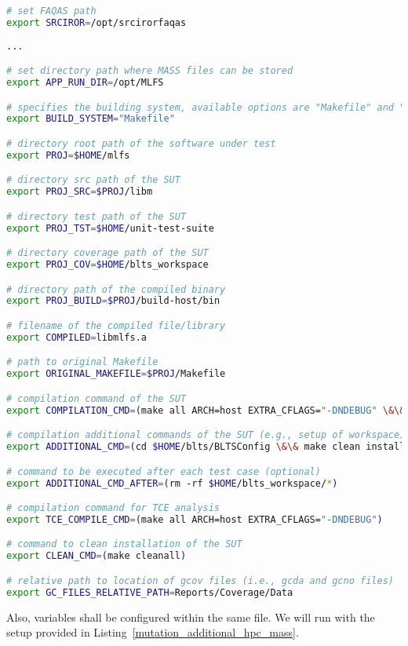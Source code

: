 \begin{lstlisting}[language=bash, label=mutation_additional_hpc ,caption=\MASS variables. Excerpt of mass\_conf.sh file.]
# set FAQAS path
export SRCIROR=/opt/srcirorfaqas
                                                     
...

# set directory path where MASS files can be stored
export APP_RUN_DIR=/opt/MLFS

# specifies the building system, available options are "Makefile" and "waf"
export BUILD_SYSTEM="Makefile"

# directory root path of the software under test
export PROJ=$HOME/mlfs

# directory src path of the SUT
export PROJ_SRC=$PROJ/libm

# directory test path of the SUT
export PROJ_TST=$HOME/unit-test-suite

# directory coverage path of the SUT
export PROJ_COV=$HOME/blts_workspace

# directory path of the compiled binary
export PROJ_BUILD=$PROJ/build-host/bin

# filename of the compiled file/library
export COMPILED=libmlfs.a

# path to original Makefile
export ORIGINAL_MAKEFILE=$PROJ/Makefile

# compilation command of the SUT
export COMPILATION_CMD=(make all ARCH=host EXTRA_CFLAGS="-DNDEBUG" \&\& make all COVERAGE="true" ARCH=host_cov EXTRA_CFLAGS="-DNDEBUG")

# compilation additional commands of the SUT (e.g., setup of workspace)
export ADDITIONAL_CMD=(cd $HOME/blts/BLTSConfig \&\& make clean install INSTALL_PATH="$HOME/blts_install" \&\& cd $HOME/blts_workspace \&\& $HOME/blts_install/bin/blts_app --init)

# command to be executed after each test case (optional)
export ADDITIONAL_CMD_AFTER=(rm -rf $HOME/blts_workspace/*)

# compilation command for TCE analysis
export TCE_COMPILE_CMD=(make all ARCH=host EXTRA_CFLAGS="-DNDEBUG")

# command to clean installation of the SUT
export CLEAN_CMD=(make cleanall)

# relative path to location of gcov files (i.e., gcda and gcno files)
export GC_FILES_RELATIVE_PATH=Reports/Coverage/Data
\end{lstlisting}

Also, \MASS variables shall be configured within the same file. We will run \MASS with the setup provided in Listing~\ref{mutation_additional_hpc_mass}. 

